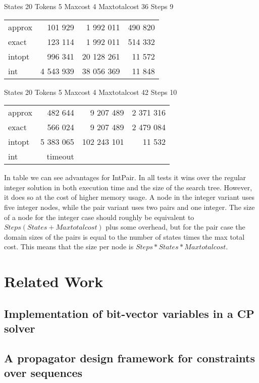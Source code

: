 \documentclass[a4paper,11pt]{article}
\begin{document}
\begin{table}
States 20 Tokens 5 Maxcost 4 Maxtotalcost 36 Steps 9 \\
\begin{tabular}{l r r r}
approx & 101 929 & 1 992 011 & 490 820 \\
exact & 123 114 & 1 992 011 & 514 332 \\
intopt & 996 341 & 20 128 261 & 11 572 \\
int & 4 543 939 & 38 056 369 & 11 848 \\
\end{tabular}
\end{table}

\begin{table}
States 20 Tokens 5 Maxcost 4 Maxtotalcost 42 Steps 10 \\
\begin{tabular}{l r r r}
approx & 482 644 & 9 207 489 & 2 371 316 \\
exact & 566 024 & 9 207 489 & 2 479 084 \\
intopt & 5 383 065 & 102 243 101 & 11 532 \\
int & timeout \\
\end{tabular}
\end{table}
In table we can see advantages for IntPair. In all tests it wins over the regular integer solution in both execution time and the size of the search tree. However, it does so at the cost of higher memory usage. A node in the integer variant uses five integer nodes, while the pair variant uses two pairs and one integer. The size of a node for the integer case should roughly be equivalent to $Steps(States + Maxtotalcost)$ plus some overhead, but for the pair case the domain sizes of the pairs is equal to the number of states times the max total cost. This means that the size per node is $Steps*States*Maxtotalcost$.
\section{Related Work}
\subsection{Implementation of bit-vector variables in a CP solver}
\subsection{A propagator design framework for constraints over sequences}
\end{document}
